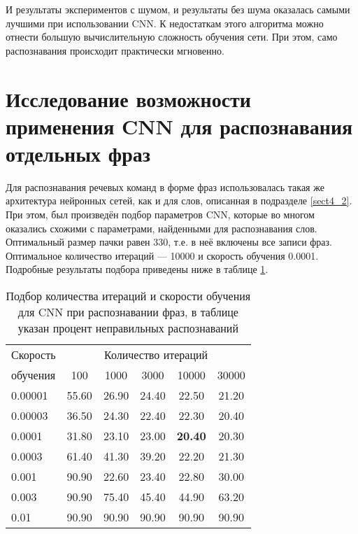 И результаты экспериментов с шумом, и результаты без шума оказалась самыми лучшими при использовании CNN.
К недостаткам этого алгоритма можно отнести большую вычислительную сложность обучения сети.
При этом, само распознавания происходит практически мгновенно.

\clearpage


\section{Исследование возможности применения CNN для распознавания отдельных фраз} \label{sect4_5}

Для распознавания речевых команд в форме фраз использовалась такая же архитектура нейронных сетей, как и для слов, описанная в подразделе \ref{sect4_2}.
При этом, был произведён подбор параметров CNN, которые во многом оказались схожими с параметрами, найденными для распознавания слов.
Оптимальный размер пачки равен 330, т.е. в неё включены все записи фраз.
Оптимальное количество итераций --- 10000 и скорость обучения 0.0001.
Подробные результаты подбора приведены ниже в таблице \ref{tab:cnn_phrases_bf_iter_pace}.

\begin{table}[h]
	\centering
	\caption{Подбор количества итераций и скорости обучения для CNN при распознавании фраз, в таблице указан процент неправильных распознаваний}
	\label{tab:cnn_phrases_bf_iter_pace}
	\begin{tabular}{| l | c | c | c | c | c |}
		\hline
		Скорость & \multicolumn{5}{c|}{Количество итераций} \\
		\hhline{~-----}
		обучения \phantom{00} & \phantom{000} 100 \phantom{000} & \phantom{000}1000\phantom{000} & \phantom{000}3000\phantom{000} & \phantom{00} 10000 \phantom{00} & \phantom{00} 30000 \phantom{00} \\
		\hline
		0.00001	& 55.60 & 26.90 & 24.40 & 22.50 & 21.20 \\
		0.00003	& 36.50 & 24.30 & 22.40 & 22.30 & 20.40 \\
		0.0001	& 31.80 & 23.10 & 23.00 & \textbf{20.40} & 20.30 \\
		0.0003	& 61.40 & 41.30 & 39.20 & 22.20 & 21.30 \\
		0.001	& 90.90 & 22.60 & 23.40 & 22.80 & 30.00 \\
		0.003	& 90.90 & 75.40 & 45.40 & 44.90 & 63.20 \\
		0.01	& 90.90 & 90.90 & 90.90 & 90.90 & 90.90 \\
		\hline
	\end{tabular}
\end{table}

